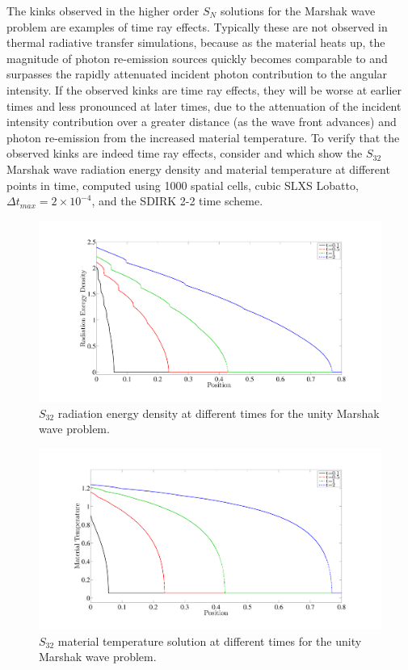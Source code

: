 The kinks observed in the higher order $S_N$ solutions for the Marshak wave problem are examples of time ray effects.
Typically these are not observed in thermal radiative transfer simulations, because as the material heats up, the magnitude of photon re-emission sources quickly becomes comparable to and surpasses the rapidly attenuated incident photon contribution to the angular intensity.
If the observed kinks are time ray effects, they will be worse at earlier times and less pronounced at later times, due to the attenuation of the incident intensity contribution over a greater distance (as the wave front advances) and photon re-emission from the increased material temperature.
To verify that the observed kinks are indeed time ray effects, consider  and  which show the $S_{32}$ Marshak wave radiation energy density and material temperature at different points in time, computed using 1000 spatial cells, cubic SLXS Lobatto, $\Delta t_{max} = 2 \times 10^{-4}$, and the SDIRK 2-2 time scheme.
\begin{figure}[!htp]
\centering
\includegraphics[width=17cm,trim=2in  0.5in 0.5in 0.75in,clip=true]{chapter6_grey_radtran/Dissertation_Data/S32_Time_Ray_Effects_Radiation_Cv1_SigA1.pdf}
\caption{$S_{32}$ radiation energy density at different times for the unity Marshak wave problem.}
\label{fig:phi_time_slices}
\end{figure}
\begin{figure}[!hbp]
\centering
\includegraphics[width=17cm,trim=2in  0.4in 0.5in 0.75in,clip=true]{chapter6_grey_radtran/Dissertation_Data/S32_Time_Ray_Effects_Temperature_Cv1_SigA1.pdf}
\caption{$S_{32}$ material temperature solution at different times for the unity Marshak wave problem.}
\label{fig:temp_time_slices}
\end{figure}

